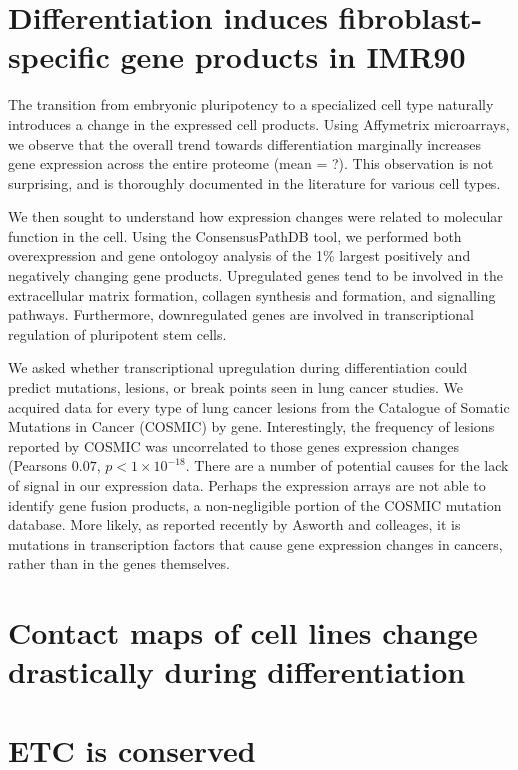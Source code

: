\documentclass[phd,tocprelim]{cornell}
\begin{document}
\section{Differentiation induces fibroblast-specific gene products in IMR90}

The transition from embryonic pluripotency to a specialized cell type naturally introduces a change in the expressed cell products.
Using Affymetrix microarrays, we observe that the overall trend towards differentiation marginally increases gene expression across
the entire proteome (mean = ?).  This observation is not surprising, and is thoroughly documented in the literature\cite{tuomela2012}
for various cell types.

We then sought to understand how expression changes were related to molecular function in the cell.  Using the ConsensusPathDB
tool\cite{kamburov2012}, we performed both overexpression and gene ontologoy analysis of the 1\%  largest positively and negatively
changing gene products.  Upregulated genes tend to be involved in the extracellular matrix formation, collagen synthesis and formation,
and signalling pathways.  Furthermore, downregulated genes are involved in transcriptional regulation of pluripotent stem cells.

We asked whether transcriptional upregulation during differentiation could predict mutations, lesions, or break points seen in lung
cancer studies.  We acquired data for every type of lung cancer lesions from the Catalogue of Somatic Mutations in Cancer
(COSMIC)\cite{forbes2009} by gene.  Interestingly, the frequency of lesions reported by COSMIC was uncorrelated to those genes
expression changes (Pearsons $0.07$, $p < 1 \times 10^{-18}$.  There are a number of potential causes for the lack of signal in
our expression data.  Perhaps the expression arrays are not able to identify gene fusion products, a non-negligible portion of
the COSMIC mutation database.  More likely, as reported recently by Asworth and colleages, it is mutations in transcription factors
that cause gene expression changes in cancers, rather than in the genes themselves\cite{ashworth2014}.

\section{Contact maps of cell lines change drastically during differentiation}

\section{ETC is conserved}
\end{document}
